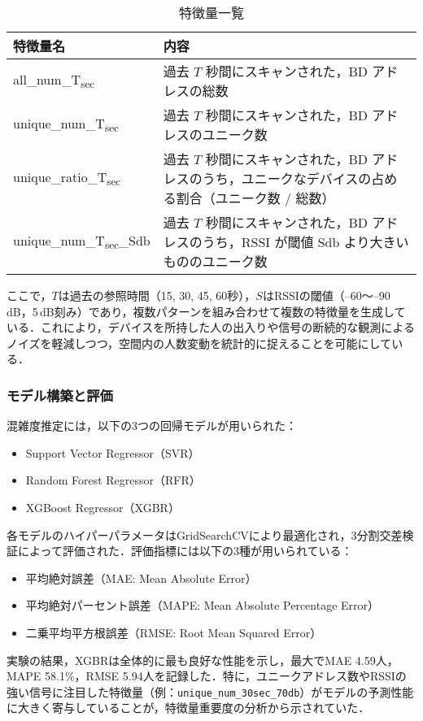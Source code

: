 \begin{table}[tb]
	\centering
	\caption{特徴量一覧}
	\label{tbl:blece_features}
	\small
	\doublerulesep=0.3pt
    \begin{tabular}{l|p{5cm}} \hline\hline\hline
		特徴量名 & 内容 \\ \hline
		all\_num\_T\textsubscript{sec} & 過去 $T$ 秒間にスキャンされた，BD アドレスの総数\\ \hline
    unique\_num\_T\textsubscript{sec} & 過去 $T$ 秒間にスキャンされた，BD アドレスのユニーク数 \\ \hline
    unique\_ratio\_T\textsubscript{sec} & 過去 $T$ 秒間にスキャンされた，BD アドレスのうち，ユニークなデバイスの占める割合（ユニーク数 / 総数） \\ \hline
    unique\_num\_T\textsubscript{sec}\_Sdb & 過去 $T$ 秒間にスキャンされた，BD アドレスのうち，RSSI が閾値 Sdb より大きいもののユニーク数 \\ \hline\hline\hline
	\end{tabular}
\end{table}

ここで，$T$は過去の参照時間（15, 30, 45, 60秒），$S$はRSSIの閾値（--60〜--90\,dB，5\,dB刻み）であり，複数パターンを組み合わせて複数の特徴量を生成している．これにより，デバイスを所持した人の出入りや信号の断続的な観測によるノイズを軽減しつつ，空間内の人数変動を統計的に捉えることを可能にしている．

\subsubsection*{モデル構築と評価}

混雑度推定には，以下の3つの回帰モデルが用いられた：

\begin{itemize}
  \item Support Vector Regressor（SVR）
  \item Random Forest Regressor（RFR）
  \item XGBoost Regressor（XGBR）
\end{itemize}

各モデルのハイパーパラメータはGridSearchCVにより最適化され，3分割交差検証によって評価された．評価指標には以下の3種が用いられている：

\begin{itemize}
  \item 平均絶対誤差（MAE: Mean Absolute Error）
  \item 平均絶対パーセント誤差（MAPE: Mean Absolute Percentage Error）
  \item 二乗平均平方根誤差（RMSE: Root Mean Squared Error）
\end{itemize}

実験の結果，XGBRは全体的に最も良好な性能を示し，最大でMAE 4.59人，MAPE 58.1\%，RMSE 5.94人を記録した．特に，ユニークアドレス数やRSSIの強い信号に注目した特徴量（例：\texttt{unique\_num\_30sec\_70db}）がモデルの予測性能に大きく寄与していることが，特徴量重要度の分析から示されていた．

